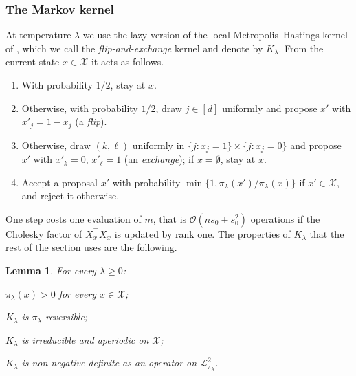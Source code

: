 \documentclass[aos]{imsart}%
\newcommand{\ambientspace}[0]{\mathcal{X}}
\newcommand{\calL}[0]{\mathcal{L}}
\newcommand{\OO}{\mathcal{O}}  %
\theoremstyle{plain}
\newtheorem{lemma}[theorem]{Lemma}
\theoremstyle{definition}
\begin{document}
    \subsubsection{The Markov kernel}
    \label{sub:binary_kernel}

    At temperature $\lambda$ we use the lazy version of the local
    Metropolis--Hastings kernel of \citet{YangWainwrightJordan2016}, which we
    call the \emph{flip-and-exchange} kernel and denote by $K_\lambda$. From the
    current state $x\in\ambientspace$ it acts as follows.

    \begin{enumerate}[label=(K\arabic*),leftmargin=3.4em,noitemsep]
        \item\label{K:lazy} With probability $1/2$, stay at $x$.
        \item\label{K:flip} Otherwise, with probability $1/2$, draw
        $j\in[d]$ uniformly and propose $x'$ with $x'_j=1-x_j$ (a
        \emph{flip}).
        \item\label{K:exch} Otherwise, draw $(k,\ell)$ uniformly in
        $\{j:x_j=1\}\times\{j:x_j=0\}$ and propose $x'$ with $x'_k=0$,
        $x'_\ell=1$ (an \emph{exchange}); if $x=\emptyset$, stay at $x$.
        \item\label{K:acc} Accept a proposal $x'$ with probability
        $\min\{1,\pi_\lambda(x')/\pi_\lambda(x)\}$ if $x'\in\ambientspace$, and
        reject it otherwise.
    \end{enumerate}

    One step costs one evaluation of $m$, that is $\OO(ns_0+s_0^{2})$
    operations if the Cholesky factor of $X_x^{\top}X_x$ is updated by rank
    one. The properties of $K_\lambda$ that the rest of the section uses are
    the following.

    \begin{lemma}
        \label{lemma:binary_kernel_basic}
        For every $\lambda\geq0$:
        \begin{equivcond}
            \item\label{it:binary_ker_supp} $\pi_\lambda(x)>0$ for every
            $x\in\ambientspace$;
            \item\label{it:binary_ker_rev} $K_\lambda$ is
            $\pi_\lambda$-reversible;
            \item\label{it:binary_ker_irr} $K_\lambda$ is irreducible and
            aperiodic on $\ambientspace$;
            \item\label{it:binary_ker_psd} $K_\lambda$ is non-negative definite
            as an operator on $\calL^{2}_{\pi_\lambda}$.
        \end{equivcond}
    \end{lemma}
\end{document}
